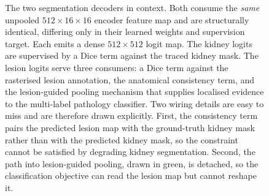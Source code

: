 \begin{figure}[t]
{}
\caption{The two segmentation decoders in context. Both consume the \emph{same}
unpooled $512{\times}16{\times}16$ encoder feature map and are structurally
identical, differing only in their learned weights and supervision target. Each
emits a dense $512{\times}512$ logit map. The kidney logits are supervised by a
Dice term against the traced kidney mask. The lesion logits serve three
consumers: a Dice term against the rasterised lesion annotation, the anatomical
consistency term, and the lesion-guided pooling mechanism that supplies
localised evidence to the multi-label pathology classifier. Two wiring details
are easy to miss and are therefore drawn explicitly. First, the consistency term
pairs the predicted lesion map with the ground-truth kidney mask rather than
with the predicted kidney mask, so the constraint cannot be satisfied by
degrading kidney segmentation. Second, the path into lesion-guided pooling,
drawn in green, is detached, so the classification objective can read the lesion
map but cannot reshape it.}\label{fig:decoders-combined}
\end{figure}
